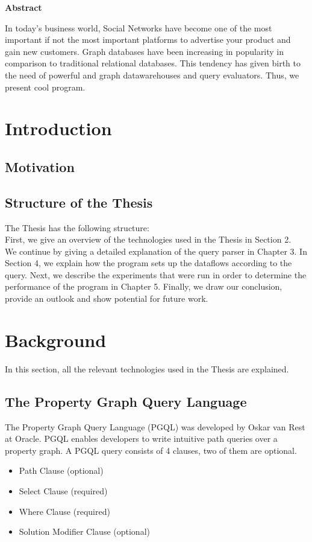 \documentclass[11pt,singlecolumn]{scrartcl}
\begin{document}
\hspace{60mm}
\begin{center}
 \textbf{Abstract} \end{center}
In today's business world, Social Networks have become one of the most important if not the most important platforms to advertise your product and gain new customers. Graph databases have been increasing in popularity in comparison to traditional relational databases. This tendency has given birth to the need of powerful and graph datawarehouses and query evaluators. Thus, we present cool program.


\clearpage
\tableofcontents
\clearpage
\section{Introduction}
\subsection{Motivation}
\subsection{Structure of the Thesis}
The Thesis has the following structure:\\
First, we give an overview of the technologies used in the Thesis in Section 2.\\
We continue by giving a detailed explanation of the query parser  in Chapter 3. In Section 4, we explain how the program sets up the dataflows according to the query. Next, we describe the experiments that were run in order to determine the performance of the program in Chapter 5. Finally, we draw our conclusion, provide an outlook and show potential for future work.
\clearpage

\section{Background}
In this section, all the relevant technologies used in the Thesis are explained.
\subsection{The Property Graph Query Language}

The Property Graph Query Language (PGQL) was developed by Oskar van Rest at Oracle. \cite{vanRest:2016} PGQL enables developers to write intuitive path queries over a property graph. A PGQL query consists of 4 clauses, two of them are optional.
\begin{itemize} 
\item Path Clause (optional)
\item Select Clause (required)
\item Where Clause (required)
\item Solution Modifier Clause (optional)
\end{itemize}
\end{document}
